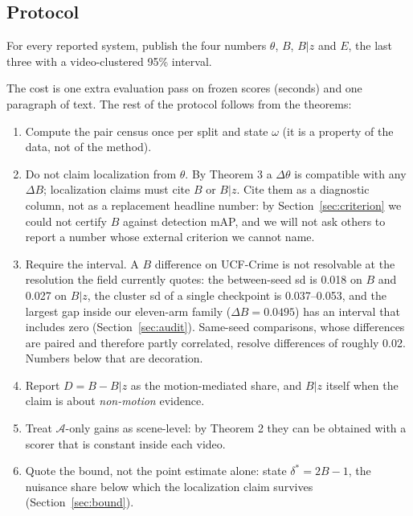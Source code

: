 \documentclass[number,preprint,12pt]{elsarticle}
\providecommand{\tightlist}{\setlength{\itemsep}{0pt}\setlength{\parskip}{0pt}}
\begin{document}
\subsection{Protocol}\label{sec:protocol}

For every reported system, publish the four numbers \(\theta\), \(B\), \(B|z\) and \(E\),
the last three with a video-clustered 95\% interval.

The cost is one extra evaluation pass on frozen scores (seconds) and one
paragraph of text. The rest of the protocol follows from the theorems:

\begin{enumerate}
\def\labelenumi{\arabic{enumi}.}
\tightlist
\item
  Compute the pair census once per split and state \(\omega\) (it is a property of the
  data, not of the method).
\item
  Do not claim localization from \(\theta\). By Theorem 3 a \(\Delta\theta\) is compatible with any
  \(\Delta B\); localization claims must cite \(B\) or \(B|z\). Cite them as a
  diagnostic column, not as a replacement headline number: by
  Section~\ref{sec:criterion} we could not certify \(B\) against detection mAP,
  and we will not ask others to report a number whose external criterion we
  cannot name.
\item
  Require the interval. A \(B\) difference on UCF-Crime is not resolvable at the
  resolution the field currently quotes: the between-seed sd is 0.018 on \(B\) and
  0.027 on \(B|z\), the cluster sd of a single checkpoint is 0.037--0.053, and the
  largest gap inside our eleven-arm family (\(\Delta B=0.0495\)) has an interval
  that includes zero (Section~\ref{sec:audit}). Same-seed comparisons, whose
  differences are paired and therefore partly correlated, resolve differences of
  roughly 0.02. Numbers below that are decoration.
\item
  Report \(D = B - B|z\) as the motion-mediated share, and \(B|z\) itself when the
  claim is about \emph{non-motion} evidence.
\item
  Treat \(\mathcal{A}\)-only gains as scene-level: by Theorem 2 they can be obtained with a
  scorer that is constant inside each video.
\item
  Quote the bound, not the point estimate alone: state \(\delta^{*}=2B-1\), the nuisance
  share below which the localization claim survives (Section~\ref{sec:bound}).
\end{enumerate}
\end{document}
